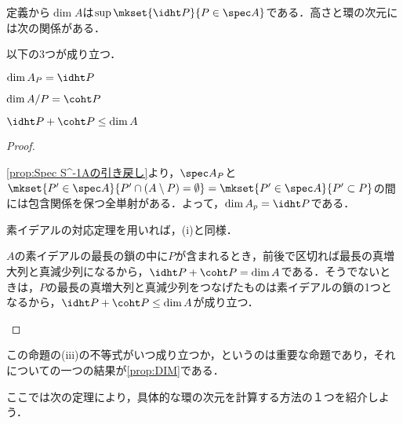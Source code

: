 定義から$\dim A$は$\sup\mkset{\idht P}{P\in\spec A}$である．高さと環の次元には次の関係がある．
	
\begin{prop}\label{prop:htとcohtの定義}
	以下の3つが成り立つ．
	\begin{sakura}
		\item $\dim A_P=\idht P$
		\item $\dim A/P=\coht P$
		\item $\idht P+\coht P\leq\dim A$
	\end{sakura}
\end{prop}

\begin{proof}
	\begin{sakura}
		\item 
			\ref{prop:Spec S^-1Aの引き戻し}より，$\spec A_P$と$\mkset{ P '\in\spec A}{ P '\cap (A\setminus P )=\emptyset}=\mkset{ P '\in\spec A}{ P '\subset P }$の間には包含関係を保つ全単射がある．よって，$\dim A_p=\idht P $である．
		\item 
			素イデアルの対応定理を用いれば，(i)と同様．
		\item 
			$A$の素イデアルの最長の鎖の中に$ P $が含まれるとき，前後で区切れば最長の真増大列と真減少列になるから，$\idht P +\coht P =\dim A$である．そうでないときは，$ P $の最長の真増大列と真減少列をつなげたものは素イデアルの鎖の1つとなるから，$\idht P +\coht P \leq\dim A$が成り立つ．
	\end{sakura}
\end{proof}
	
この命題の(iii)の不等式がいつ成り立つか，というのは重要な命題であり，それについての一つの結果が\ref{prop:DIM}である．

ここでは次の定理により，具体的な環の次元を計算する方法の１つを紹介しよう．

